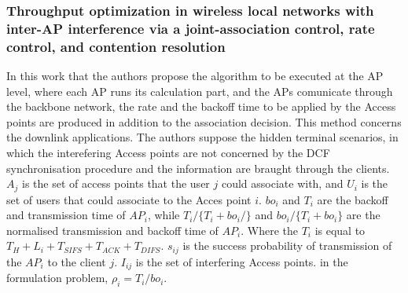 \documentclass[journal,transmag]{IEEEtran}
\begin{document}
\subsubsection{Throughput optimization in wireless local networks with inter-AP interference via a joint-association control, rate control, and contention resolution \cite{14throughput_optimisation_AP_association_interefrence}}
In this work that the authors propose the algorithm to be executed at the AP level, where each AP runs its calculation part, and the APs comunicate through the backbone network, the rate and the backoff time to be applied by the Access points are produced in addition to the association decision. This method concerns the downlink applications. The authors suppose the hidden terminal scenarios, in which the interefering Access points are not concerned by the DCF synchronisation procedure and the information are braught through the clients. $A_j$ is the set of access points that the user $j$ could associate with, and $U_i$ is the set of users that could associate to the Acces point $i$. $bo_i$ and $T_i$ are the backoff and transmission time of $AP_i$, while $T_i/\{T_i+bo_i/\}$ and $bo_i/\{T_i+bo_i\}$ are the normalised transmission and backoff time of $AP_i$. Where the $T_i$ is equal to $T_H+L_i+T_{SIFS}+T_{ACK}+T_{DIFS}$. $s_{ij}$ is the success probability of transmission of the $AP_i$ to the client $j$. $I_{ij}$ is the set of interfering Access points. in the formulation problem, $\rho_i=T_i/bo_i$.
\end{document}
